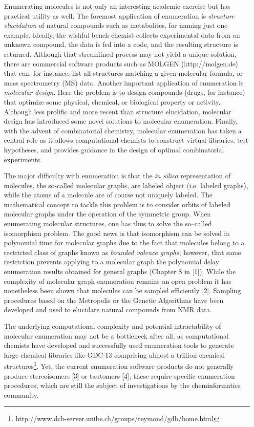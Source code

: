 \documentclass{sig-alternate}
\begin{document}
Enumerating molecules is not only an interesting academic exercise but has
practical utility as well. The foremost application of enumeration is \emph{structure
elucidation} of natural compounds such as metabolites, for naming just one example. 
Ideally, the wishful bench chemist collects experimental data
from an unknown compound, the data is fed into a code, and the resulting
structure is returned. Although that streamlined process may not yield a unique
solution, there are commercial software products such as MOLGEN
(http://molgen.de) that can, for instance, list all structures matching a given
molecular formula, or mass spectrometry (MS) data. Another important application
of enumeration is \emph{molecular design}. Here the problem is to design compounds
(drugs, for instance) that optimize some physical, chemical, or biological
property or activity. Although less prolific and more recent than structure
elucidation, molecular design has introduced some novel solutions to molecular
enumeration. Finally, with the advent of combinatorial chemistry, molecular
enumeration has taken a central role as it allows computational chemists to
construct virtual libraries, test hypotheses, and provides guidance in the
design of optimal combinatorial experiments.

The major difficulty with enumeration is that the \emph{in silico} representation of
molecules, the so-called molecular graphs, are labeled object (i.e. labeled
graphs), while the atoms of a molecule are of course not uniquely labeled. The
mathematical concept to tackle this problem is to consider orbits of labeled
molecular graphs under the operation of the symmetric group. When enumerating
molecular structures, one has thus to solve the so--called isomorphism problem.
The good news is that isomorphism can be solved in polynomial time for molecular
graphs due to the fact that molecules belong to a restricted class of graphs
known as \emph{bounded valence graphs}; however, that same restriction prevents
applying to a molecular graph the polynomial delay enumeration results obtained
for general graphs (Chapter 8 in [1]). While the complexity of molecular graph
enumeration remains an open problem it has nonetheless been shown that molecules
can be sampled efficiently [2]. Sampling procedures based on the Metropolis or
the Genetic Algorithms have been developed and used to elucidate natural
compounds from NMR data.

The underlying computational complexity and potential intractability
of molecular enumeration may not be a bottleneck after all, as
computational chemists have developed and successfully used
enumeration tools to generate large chemical libraries like GDC-13
comprising almost a trillion chemical
structures\footnote{http://www.dcb-server.unibe.ch/groups/reymond/gdb/home.html}. Yet,
the current enumeration software products do not generally produce
stereoisomers [3] or tautomers [4]; these require specific enumeration
procedures, which are still the subject of investigations by the
cheminformatics community.
\end{document}
